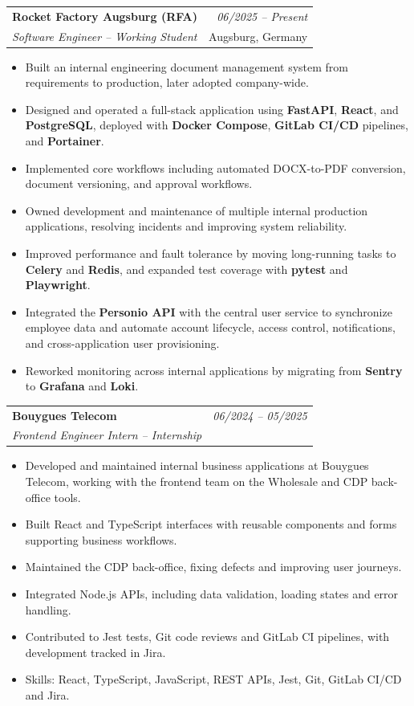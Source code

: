 \documentclass[a4paper,11pt]{article}
\makeatletter
\newcommand{\resumeSubheading}[4]{
\vspace{0.5mm}\item
    \begin{tabular*}{0.98\textwidth}[t]{l@{\extracolsep{\fill}}r}
        \textbf{#1} & \textit{\small{#4}} \\
        \textit{\small{#3}} &  \small{#2}\\
    \end{tabular*}
    \vspace{-1.5mm}
}
\newcommand{\resumeItemListStart}{\begin{justify}\begin{itemize}[leftmargin=3ex, rightmargin=2ex, labelsep=1.2mm,itemsep=0.5pt,parsep=0.5pt,topsep=1pt]\normalsize}
\newcommand{\resumeItemListEnd}{\end{itemize}\end{justify}\vspace{-0.5mm}}
\makeatother
\begin{document}
\resumeSubheading
  {Rocket Factory Augsburg (RFA)}{Augsburg, Germany}
  {Software Engineer -- Working Student}{06/2025 -- Present}
  \resumeItemListStart
    \item{Built an internal engineering document management system from requirements to production, later adopted company-wide.}
    \item{Designed and operated a full-stack application using \textbf{FastAPI}, \textbf{React}, and \textbf{PostgreSQL}, deployed with \textbf{Docker Compose}, \textbf{GitLab CI/CD} pipelines, and \textbf{Portainer}.}
    \item{Implemented core workflows including automated DOCX-to-PDF conversion, document versioning, and approval workflows.}
    \item{Owned development and maintenance of multiple internal production applications, resolving incidents and improving system reliability.}
    \item{Improved performance and fault tolerance by moving long-running tasks to \textbf{Celery} and \textbf{Redis}, and expanded test coverage with \textbf{pytest} and \textbf{Playwright}.}
    \item{Integrated the \textbf{Personio API} with the central user service to synchronize employee data and automate account lifecycle, access control, notifications, and cross-application user provisioning.}
    \item{Reworked monitoring across internal applications by migrating from \textbf{Sentry} to \textbf{Grafana} and \textbf{Loki}.}
  \resumeItemListEnd

\resumeSubheading
  {Bouygues Telecom}{}
  {Frontend Engineer Intern -- Internship}{06/2024 -- 05/2025}
  \resumeItemListStart
    \item{Developed and maintained internal business applications at Bouygues Telecom, working with the frontend team on the Wholesale and CDP back-office tools.}
    \item{Built React and TypeScript interfaces with reusable components and forms supporting business workflows.}
    \item{Maintained the CDP back-office, fixing defects and improving user journeys.}
    \item{Integrated Node.js APIs, including data validation, loading states and error handling.}
    \item{Contributed to Jest tests, Git code reviews and GitLab CI pipelines, with development tracked in Jira.}
    \item{Skills: React, TypeScript, JavaScript, REST APIs, Jest, Git, GitLab CI/CD and Jira.}
  \resumeItemListEnd
\end{document}
